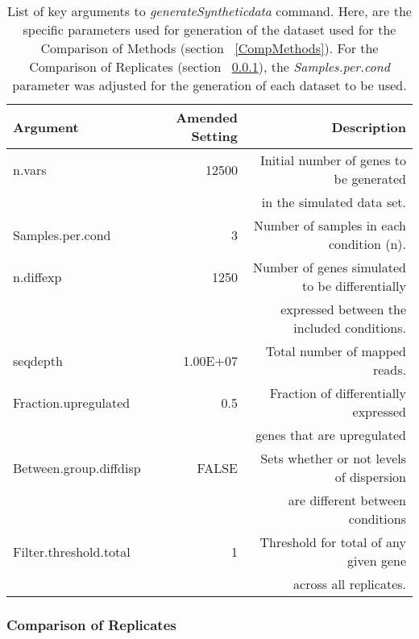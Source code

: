 \begin{table}[!htbp]
\scriptsize
\centering
\begin{tabular}{lrr}
\textbf{Argument}               & \textbf{Amended Setting} & \textbf{Description}                                                                               \\
\hline
n.vars                 & 12500           & Initial number of genes to be generated \\
                      &                 & in the simulated data set.                        \\
Samples.per.cond       & 3               & Number of samples in each condition (n).                                                  \\
n.diffexp              & 1250            & Number of genes simulated to be differentially \\
                      &                   & expressed between the included conditions. \\
seqdepth               & 1.00E+07        & Total number of mapped reads.                                                             \\
Fraction.upregulated   & 0.5             & Fraction of differentially expressed  \\
                        &               & genes that are upregulated                           \\
Between.group.diffdisp & FALSE           & Sets whether or not levels of dispersion \\
                        &                 &are different between conditions                 \\
Filter.threshold.total & 1               & Threshold for total of any given gene \\
&& across all replicates.                             \\
\end{tabular}
\caption[List of key arguments to \textit{generateSyntheticdata} command.]{List of key arguments to \textit{generateSyntheticdata} command. Here, are the specific parameters used for generation of the dataset used for the Comparison of Methods (section ~\ref{CompMethods}). For the Comparison of Replicates (section ~\ref{CompReplicates}), the \textit{Samples.per.cond} parameter was adjusted for the generation of each dataset to be used.}
\label{table:compcodeRsettings}
\end{table}

\subsubsection{Comparison of Replicates} \label{CompReplicates}

